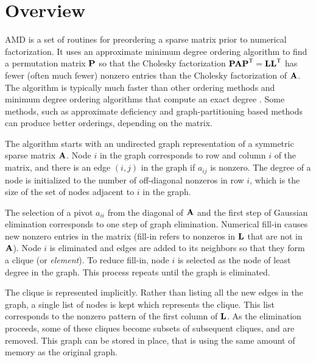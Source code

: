 \documentclass[11pt]{article}
\newcommand{\m}[1]{{\bf{#1}}}       %
\newcommand{\tr}{^{\sf T}}          %
\begin{document}
\newpage
\section{Overview}

AMD is a set of routines for preordering a sparse matrix prior to
numerical factorization.  It uses an approximate minimum degree ordering
algorithm \cite{AmestoyDavisDuff96,AmestoyDavisDuff04}
to find a permutation matrix $\m{P}$
so that the Cholesky factorization $\m{PAP}\tr=\m{LL}\tr$ has fewer
(often much fewer) nonzero entries than the Cholesky factorization of $\m{A}$.
The algorithm is typically much faster than other ordering methods
and  minimum degree ordering
algorithms that compute an exact degree \cite{GeorgeLiu89}.
Some methods, such as approximate deficiency
\cite{RothbergEisenstat98} and graph-partitioning based methods
\cite{Chaco,KarypisKumar98e,PellegriniRomanAmestoy00,schu:01}
can produce better orderings, depending on the matrix.

The algorithm starts with an undirected graph representation of a
symmetric sparse matrix $\m{A}$.  Node $i$ in the graph corresponds to row
and column $i$ of the matrix, and there is an edge $(i,j)$ in the graph if
$a_{ij}$ is nonzero.
The degree of a node is initialized to the number of off-diagonal nonzeros
in row $i$, which is the size of the set of nodes
adjacent to $i$ in the graph.

The selection of a pivot $a_{ii}$ from the diagonal of $\m{A}$ and the first
step of Gaussian elimination corresponds to one step of graph elimination.
Numerical fill-in causes new nonzero entries in the matrix
(fill-in refers to
nonzeros in $\m{L}$ that are not in $\m{A}$).
Node $i$ is eliminated and edges are added to its neighbors
so that they form a clique (or {\em element}).  To reduce fill-in,
node $i$ is selected as the node of least degree in the graph.
This process repeats until the graph is eliminated.

The clique is represented implicitly.  Rather than listing all the
new edges in the graph, a single list of nodes is kept which represents
the clique.  This list corresponds to the nonzero pattern of the first
column of $\m{L}$.  As the elimination proceeds, some of these cliques
become subsets of subsequent cliques, and are removed.   This graph
can be stored in place, that is
using the same amount of memory as the original graph.
\end{document}
